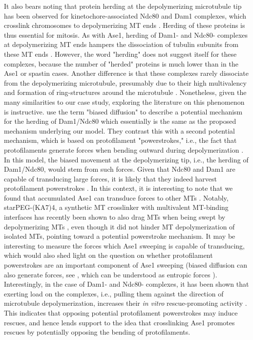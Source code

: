 It also bears noting that protein herding at the depolymerizing microtubule tip has been observed for kinetochore-associated Ndc80 and Dam1 complexes, which crosslink chromosomes to depolymerizing MT ends . Herding of these proteins is thus essential for mitosis. As with Ase1, herding of Dam1- and Ndc80- complexes at depolymerizing MT ends hampers the dissociation of tubulin subunits from these MT ends \parencite{Franck2007, umbreit2012ndc80, grishchuk2017biophysics}. However, the word "herding" does not suggest itself for these complexes, because the number of "herded" proteins is much lower than in the Ase1 or spastin cases. Another difference is that these complexes rarely dissociate from the depolymerizing microtubule, presumably due to their high multivalency  and formation of ring-structures around the microtubule . Nonetheless, given the many similarities to our case study, exploring the literature on this phenomenon is instructive. \cite{grishchuk2017biophysics} use the term "biased diffusion" to describe a potential mechanism for the herding of Dam1/Ndc80 which essentially is the same as the proposed mechanism underlying our model. They contrast this with a second potential mechanism, which is based on protofilament "powerstrokes," i.e., the fact that protofilaments generate forces when bending outward during depolymerization . In this model, the biased movement at the depolymerizing tip, i.e., the herding of Dam1/Ndc80, would stem from such forces. Given that Ndc80 and Dam1 are capable of transducing large forces, it is likely that they indeed harvest protofilament powerstrokes . In this context, it is interesting to note that we found that accumulated Ase1 can transduce forces to other MTs . Notably, starPEG-(KA7)4, a synthetic MT crosslinker with multivalent MT-binding interfaces has recently been shown to also drag MTs when being swept by depolymerizing MTs \parencite{Drechsler2019}, even though it did not hinder MT depolymerization of isolated MTs, pointing toward a potential powerstroke mechanism. It may be interesting to measure the forces which Ase1 sweeping is capable of transducing, which would also shed light on the question on whether protofilament powerstrokes are an important component of Ase1 sweeping (biased diffusion can also generate forces, see \cite{grishchuk2017biophysics}, which can be understood as entropic forces \cite{lanskydiffusible2015}). Interestingly, in the case of Dam1- and Ndc80- complexes, it has been shown that exerting load on the complexes, i.e., pulling them against the direction of microtubule depolymerization, increases their \textit{in vitro} rescue-promoting activity \parencite{Franck2007, volkov2018multivalency}. This indicates that opposing potential protofilament powerstrokes may induce rescues, and hence lends support to the idea that crosslinking Ase1 promotes rescues by potentially opposing the bending of protofilaments. \par

